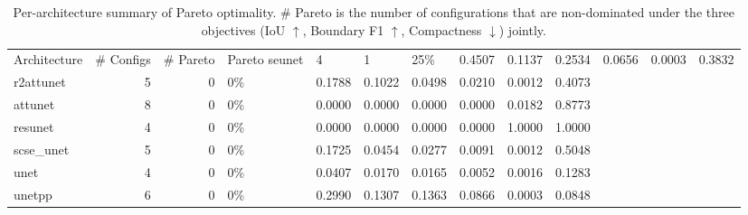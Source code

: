 \begin{table}
\caption{Per-architecture summary of Pareto optimality. \# Pareto is the number of configurations that are non-dominated under the three objectives (IoU $\uparrow$, Boundary F1 $\uparrow$, Compactness $\downarrow$) jointly.}
\label{tab:pareto_per_arch}
\begin{tabular}{lrrlllllll}
\toprule
Architecture & # Configs & # Pareto & Pareto %
\midrule
seunet & 4 & 1 & 25\% & 0.4507 & 0.1137 & 0.2534 & 0.0656 & 0.0003 & 0.3832 \\
r2attunet & 5 & 0 & 0\% & 0.1788 & 0.1022 & 0.0498 & 0.0210 & 0.0012 & 0.4073 \\
attunet & 8 & 0 & 0\% & 0.0000 & 0.0000 & 0.0000 & 0.0000 & 0.0182 & 0.8773 \\
resunet & 4 & 0 & 0\% & 0.0000 & 0.0000 & 0.0000 & 0.0000 & 1.0000 & 1.0000 \\
scse_unet & 5 & 0 & 0\% & 0.1725 & 0.0454 & 0.0277 & 0.0091 & 0.0012 & 0.5048 \\
unet & 4 & 0 & 0\% & 0.0407 & 0.0170 & 0.0165 & 0.0052 & 0.0016 & 0.1283 \\
unetpp & 6 & 0 & 0\% & 0.2990 & 0.1307 & 0.1363 & 0.0866 & 0.0003 & 0.0848 \\
\bottomrule
\end{tabular}
\end{table}
